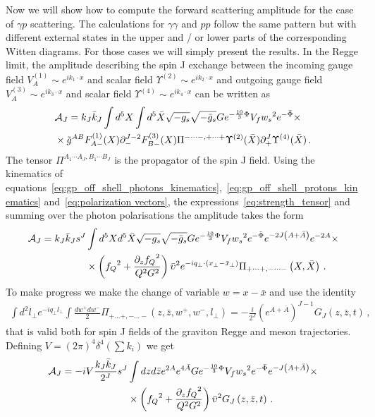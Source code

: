 \documentclass[a4paper,12pt]{article}
\begin{document}
Now we will show how to compute the forward scattering amplitude for the case of $\gamma p$ scattering. The calculations for $\gamma \gamma$ and $pp$ follow the same pattern but with different external states in the upper and / or lower parts of the corresponding Witten diagrams. For those cases we will simply present the results. In the Regge limit, the amplitude describing the spin J exchange between the incoming gauge field $V_A^{(1)} \sim  e^{i k_1 \cdot x}$ and scalar field $\Upsilon^{(2)} \sim  e^{i k_2 \cdot x}$ and outgoing gauge field $V_A^{(3)} \sim  e^{i k_3 \cdot x}$ and scalar field $\Upsilon^{(4)} \sim  e^{i k_4 \cdot x}$ can be written as
\begin{align}
&\mathcal{A}_J = k_J \bar{k}_J \int d^5 X \int d^5 \bar{X} \sqrt{-g_s} \sqrt{-\bar{g}_s} G e^{-\frac{10}{3} \Phi} V_f {w_s}^2 e^{-\bar{\Phi}}  \times \notag \\ 
& \times \tilde{g}^{AB} F^{(1)}_{A - } (X) \partial_{-}^{J-2}F^{(3)}_{B -} (X) \Pi^{- \cdots -, + \cdots +}  \Upsilon^{(2)}(\bar{X}) \partial_{+}^J \Upsilon^{(4)}(\bar{X}) \, .
\end{align}
The tensor $\Pi^{A_1 \cdots A_J, B_1 \cdots B_J}$ is the propagator of the spin J field. Using the kinematics of equations~\ref{eq:gp_off_shell_photons_kinematics},~\ref{eq:gp_off_shell_protons_kinematics} and~\ref{eq:polarization vectors}, the expressions~\ref{eq:strength_tensor} and summing over the photon polarisations the amplitude takes the form
\begin{align}
  \mathcal{A}_J = k_J \bar{k}_J s^J & \int d^5X d^5 \bar{X} \sqrt{-g_s} \sqrt{-\bar{g}_s}  G e^{-\frac{10}{3}\Phi} V_f {w_s}^2 e^{-\bar{\Phi}} e^{-2 J \left(A+\bar{A}\right)}  e^{-2A}  \times \notag \\
  &\times \left(  {f_Q}^2 + \frac{{\partial_z f_Q}^2}{Q^2 G^2}  \right) {\bar{\upsilon}}^2 e^{-i q_\perp \cdot \left( x_\perp - \bar{x}_\perp \right)} \Pi _{+\dots+,-\dots-}\left(X, \bar{X} \right) \, .
\end{align}
To make progress we make the change of variable $w = x - \bar{x}$ and use the identity
\begin{align}
 \int d^2 l_\perp e^{- i q_\perp l_\perp} \int \frac{dw^+ dw^-}{2} \Pi_{+ \dots +, - \dots -} \left(z, \bar{z}, w^+, w^-, l_\perp \right) = - \frac{i}{2^J} {\left( e^{A + \bar{A}} \right)}^{J-1}G_J \left(z, \bar{z}, t\right) \, ,
\label{eq:gJ_t_def}
\end{align}
that is valid both for spin J fields of the graviton Regge and meson trajectories. Defining $V = {\left(2 \pi\right)}^4 \delta^4\left( \sum k_i \right)$ we get
\begin{align}
  \mathcal{A}_J = - i V \frac{k_J \bar{k}_J}{2^J} s^J & \int dz d\bar{z} e^{2 A}e^{4 \bar{A}} G e^{-\frac{10}{3}\Phi} V_f {w_s}^2 e^{-\bar{\Phi}} e^{-J \left(A+\bar{A}\right)} \times \notag \\
 & \times \left(  {f_Q}^2 + \frac{{\partial_z f_Q}^2}{Q^2 G^2}  \right)  {\bar{\upsilon}}^2 G_J \left(z, \bar{z}, t\right) \, .
\end{align}
\end{document}
